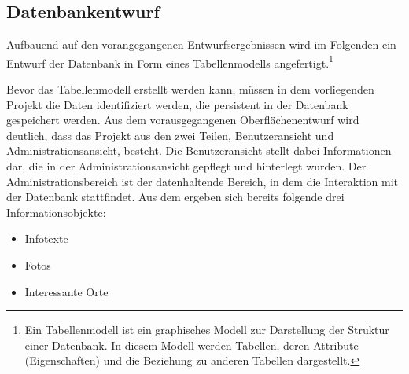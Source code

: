 \subsection{Datenbankentwurf}
\label{sec:Datenbankentwurf}

Aufbauend auf den vorangegangenen Entwurfsergebnissen wird im Folgenden ein
Entwurf der Datenbank in Form eines Tabellenmodells angefertigt.\footnote{Ein
Tabellenmodell ist ein graphisches Modell zur Darstellung der Struktur einer
Datenbank. In diesem Modell werden Tabellen, deren Attribute (Eigenschaften)
und die Beziehung zu anderen Tabellen dargestellt.}

Bevor das Tabellenmodell erstellt werden kann, müssen in dem vorliegenden
Projekt die Daten identifiziert werden, die persistent in der Datenbank
gespeichert werden. Aus dem vorausgegangenen Oberflächenentwurf wird deutlich,
dass das Projekt aus den zwei Teilen, Benutzeransicht und Administrationsansicht,
besteht. Die Benutzeransicht stellt dabei Informationen dar, die in der
Administrationsansicht gepflegt und hinterlegt wurden. Der
Administrationsbereich ist der datenhaltende Bereich, in dem die Interaktion
mit der Datenbank stattfindet. Aus dem  ergeben
sich bereits folgende drei Informationsobjekte:

\begin{itemize}
  \item Infotexte
  \item Fotos
  \item Interessante Orte
\end{itemize}

